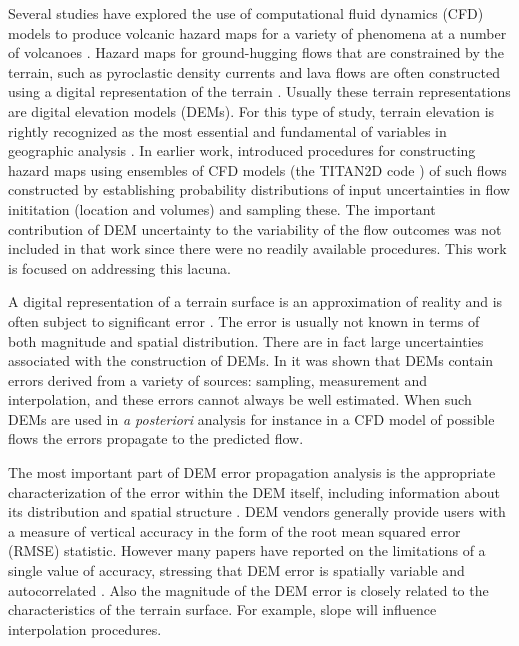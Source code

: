 \documentclass[12pt]{article}
\begin{document}
Several studies have explored the use of computational fluid
dynamics (CFD) models to produce volcanic hazard maps for a variety of
phenomena at a number of volcanoes \citep{Hooper2003, stinton_2006, murcia_2010, Proctor2010, Sheridan2010}.  Hazard maps for ground-hugging flows that are
constrained by the terrain, such as pyroclastic density currents and
lava flows are often constructed using a digital representation of the
terrain \citep{Takahashi2000, Keith}.  Usually these terrain
representations are digital elevation models (DEMs).  For this type of
study, terrain elevation is rightly recognized as the most essential
and fundamental of variables in geographic analysis
\citep{Mitasova1996, Atkinson2002, Wechsler2006, stefanescu1}. In earlier work, \citep{Keith}  introduced
procedures for constructing hazard maps using ensembles of CFD models
(the TITAN2D code \citep{Patra2005}) of such flows constructed by
establishing probability distributions of input uncertainties in flow
inititation (location and volumes) and sampling these.  The important
contribution of DEM uncertainty to the variability of the flow
outcomes was not included in that work since there were no readily
available procedures. This work is focused on addressing
this lacuna.


A digital representation of a terrain surface is an approximation of
reality and is often subject to significant error \citep{Mitasova1996}. The error is
usually not known in terms of both magnitude and spatial distribution.
There are in fact large uncertainties associated with the construction
of DEMs. In \citep{Wechsler2006} it was shown that DEMs contain errors
derived from a variety of sources: sampling, measurement and
interpolation, and these errors cannot always be well estimated. When
such DEMs are used in {\it a posteriori} analysis for instance in a
CFD model of possible flows the errors propagate to the predicted
flow.

The most important part of DEM error propagation analysis is the
appropriate characterization of the error within the DEM itself,
including information about its distribution and spatial structure
\citep{Shortridge2001}.  DEM vendors generally provide users with a
measure of vertical accuracy in the form of the root mean squared
error (RMSE) statistic. However many papers have reported on the
limitations of a single value of accuracy, stressing that DEM error is
spatially variable and autocorrelated \citep{Wechsler2006,
  Amii_Darnell}. Also the magnitude of the DEM error is closely
related to the characteristics of the terrain surface. For example,
slope will influence interpolation procedures.
\end{document}
